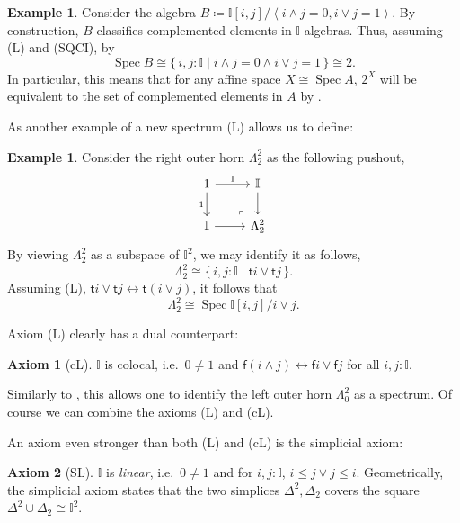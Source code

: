 \documentclass[a4paper,12pt]{amsart}
\theoremstyle{definition}
\newtheorem{example}[theorem]{Example}
\newtheorem*{axiom}{Axiom}
\newcommand{\mbb}[1]{\mathbb{#1}}
\newcommand{\I}{\mbb I}
\newcommand{\ms}[1]{\mathsf{#1}}
\newcommand{\pair}[1]{\left\langle#1\right\rangle}
\newcommand{\scomp}[2]{\{\,#1\mid#2\,\}}
\newcommand{\eq}{\leftrightarrow}
\newcommand{\spec}{\operatorname{Spec}}
\begin{document}
\begin{example}\label{exm:2isaffine}
  Consider the algebra $B \coloneq \I[i,j]/\pair{i\wedge j =0,i\vee j = 1}$. By construction, $B$ classifies complemented elements in $\I$-algebras. Thus, assuming (L) and (SQCI), by 
  \[ \spec B \cong \scomp{i,j : \I}{i \wedge j = 0 \wedge i \vee j = 1} \cong 2. \]
  In particular, this means that for any affine space $X \cong \spec A$, $2^X$ will be equivalent to the set of complemented elements in $A$ by .
\end{example}

As another example of a new spectrum (L) allows us to define:

\begin{example}\label{exm:hornaffine}
  Consider the right outer horn $\Lambda^2_2$ as the following pushout,
  \[
    \begin{tikzcd}
      1 \ar[d, "1"'] \ar[r, "1"] & \I \ar[d] \\
      \I \ar[r] & \Lambda^2_2
      \arrow["\lrcorner"{anchor=center, pos=0.125, rotate=180}, draw=none, from=2-2, to=1-1]
    \end{tikzcd}
  \]
  By viewing $\Lambda^2_2$ as a subspace of $\I^2$, we may identify it as follows,
  \[ \Lambda^2_2 \cong \scomp{i,j : \I}{\ms ti \vee \ms tj}. \]
  Assuming (L), $\ms ti \vee \ms tj \eq \ms t(i\vee j)$, it follows that 
  \[ \Lambda^2_2 \cong \spec \I[i,j]/i \vee j. \]
\end{example}

Axiom (L) clearly has a dual counterpart:

\begin{axiom}[cL]\label{ax:cL}
  $\I$ is colocal, i.e.\ $0 \neq 1$ and $\ms f(i \wedge j) \eq \ms fi \vee \ms fj$ for all $i,j : \I$.
\end{axiom}

Similarly to , this allows one to identify the left outer horn $\Lambda^2_0$ as a spectrum. Of course we can combine the axioms (L) and (cL). 

An axiom even stronger than both (L) and (cL) is the simplicial axiom:

\begin{axiom}[SL]\label{ax:SL}
  $\I$ is \emph{linear}, i.e.\ $0 \neq 1$ and for $i,j : \I$, $i \le j \vee j \le i$. Geometrically, the simplicial axiom states that the two simplices $\Delta^2,\Delta_2$ covers the square $\Delta^2 \cup \Delta_2 \cong \I^2$.
\end{axiom}
\end{document}
